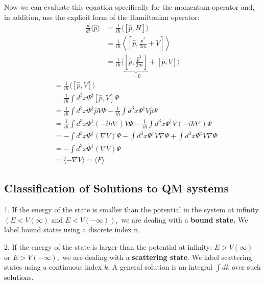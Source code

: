\begin{mybox2}
Now we can evaluate this equation specifically for the momentum operator and, in addition, use the explicit form of the Hamiltonian operator:
$$
\begin{aligned}
\frac{d}{d t}\langle\hat{p}\rangle &=\frac{1}{i \hbar}\langle[\hat{p}, H]\rangle \\
&=\frac{1}{i \hbar}\left\langle\left[\hat{p}, \frac{\hat{p}^{2}}{2 m}+V\right]\right\rangle \\
&=\frac{1}{i \hbar}\langle\underbrace{\left[\hat{p}, \frac{\hat{p}^{2}}{2 m}\right]}_{=0}+[\hat{p}, V]\rangle
\end{aligned}
$$
$$
\begin{aligned}
&=\frac{1}{i \hbar}\langle[\hat{p}, V]\rangle\\
&=\frac{1}{i \hbar} \int d^{3} x \Psi^{\dagger}[\hat{p}, V] \Psi\\
&=\frac{1}{i \hbar} \int d^{3} x \Psi^{\dagger} \hat{p} V \Psi-\frac{1}{i \hbar} \int d^{3} x \Psi^{\dagger} V \hat{p} \Psi\\
&=\frac{1}{i \hbar} \int d^{3} x \Psi^{\dagger}(-i \hbar \nabla) V \Psi-\frac{1}{i \hbar} \int d^{3} x \Psi^{\dagger} V(-i \hbar \nabla) \Psi\\
&=-\int d^{3} x \Psi^{\dagger}(\nabla V) \Psi-\int d^{3} x \Psi^{\dagger} V \nabla \Psi+\int d^{3} x \Psi^{\dagger} V \nabla \Psi\\
&=-\int d^{3} x \Psi^{\dagger}(\nabla V) \Psi\\
&=\langle-\nabla V\rangle=\langle F\rangle
\end{aligned}
$$
\end{mybox2}
\subsection{Classification of Solutions to QM systems}
1. If the energy of the state is smaller than the potential in the system at infinity $(E<V(\infty) \text { and } E<V(-\infty)),$ we are dealing with a \textbf{bound state.} We label bound states using a discrete index n.

2. If the energy of the state is larger than the potential at infinity:
$E>V(\infty)$ or $E>V(-\infty),$ we are dealing with a \textbf{scattering state}. We label scattering states using a continuous index $k$. A general solution is an integral $\int d k$ over such solutions.

